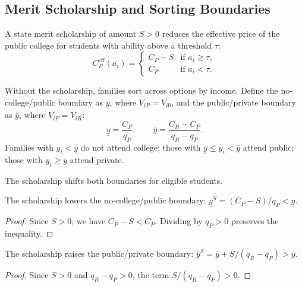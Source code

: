 \subsection{Merit Scholarship and Sorting Boundaries}

A state merit scholarship of amount $S > 0$ reduces the effective price
of the public college for students with ability above a threshold
$\tau$:
\begin{equation}
  C_P^{\text{eff}}(a_i) =
  \begin{cases}
    C_P - S & \text{if } a_i \geq \tau, \\
    C_P     & \text{if } a_i < \tau.
  \end{cases}
\end{equation}

Without the scholarship, families sort across options by income. Define
the no-college/public boundary as $\underline{y}$, where $V_{iP} =
V_{i0}$, and the public/private boundary as $\overline{y}$, where
$V_{iP} = V_{iR}$:
\begin{equation}
  \underline{y} = \frac{C_P}{q_P}, \qquad
  \overline{y} = \frac{C_R - C_P}{q_R - q_P}.
\end{equation}
Families with $y_i < \underline{y}$ do not attend college; those with
$\underline{y} \leq y_i < \overline{y}$ attend public; those with
$y_i \geq \overline{y}$ attend private.

The scholarship shifts both boundaries for eligible students.

\begin{proposition}
\label{prop:access}
The scholarship lowers the no-college/public boundary:
$\underline{y}^S = (C_P - S)/q_P < \underline{y}$.
\end{proposition}

\begin{proof}
Since $S > 0$, we have $C_P - S < C_P$. Dividing by $q_P > 0$
preserves the inequality.
\end{proof}

\begin{proposition}
\label{prop:substitution}
The scholarship raises the public/private boundary:
$\overline{y}^S = \overline{y} + S/(q_R - q_P) > \overline{y}$.
\end{proposition}

\begin{proof}
Since $S > 0$ and $q_R - q_P > 0$, the term $S/(q_R - q_P) > 0$.
\end{proof}

